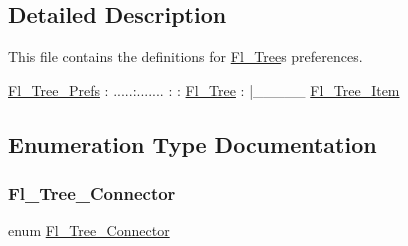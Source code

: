 \subsection{Detailed Description}
This file contains the definitions for \hyperlink{class_fl___tree}{Fl\+\_\+\+Tree}\textquotesingle{}s preferences. 


\begin{DoxyCode}
   \hyperlink{class_fl___tree___prefs}{Fl\_Tree\_Prefs}
        :
   .....:.......
   :           :
\hyperlink{class_fl___tree}{Fl\_Tree}        :
   |\_\_\_\_\_ \hyperlink{class_fl___tree___item}{Fl\_Tree\_Item}
\end{DoxyCode}
 

\subsection{Enumeration Type Documentation}
\mbox{\label{_fl___tree___prefs_8_h_a1d7f7aa31541d6792802549a830af79a}} 
\subsubsection{\texorpdfstring{Fl\+\_\+\+Tree\+\_\+\+Connector}{Fl\_Tree\_Connector}}
{\footnotesize\ttfamily enum \hyperlink{_fl___tree___prefs_8_h_a1d7f7aa31541d6792802549a830af79a}{Fl\+\_\+\+Tree\+\_\+\+Connector}}

